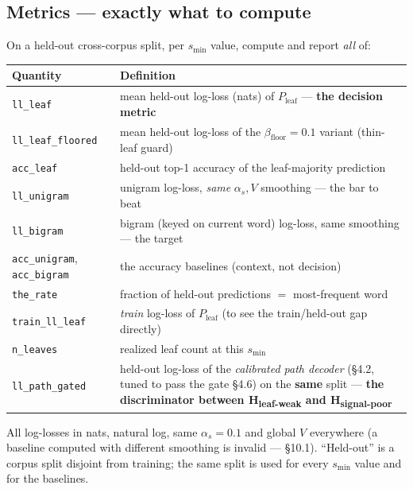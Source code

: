 \documentclass[11pt]{article}
\newcommand{\code}[1]{\texttt{#1}}
\begin{document}
\subsection{Metrics --- exactly what to compute}
On a held-out cross-corpus split, per $s_{\min}$ value, compute and report \emph{all} of:
\begin{center}
\begin{longtable}{@{}ll@{}}
\toprule
Quantity & Definition\\
\midrule
\endhead
\code{ll\_leaf} & mean held-out log-loss (nats) of $P_{\text{leaf}}$ --- \textbf{the decision metric}\\
\code{ll\_leaf\_floored} & mean held-out log-loss of the $\beta_{\text{floor}}{=}0.1$ variant (thin-leaf guard)\\
\code{acc\_leaf} & held-out top-1 accuracy of the leaf-majority prediction\\
\code{ll\_unigram} & unigram log-loss, \emph{same} $\alpha_s,V$ smoothing --- the bar to beat\\
\code{ll\_bigram} & bigram (keyed on current word) log-loss, same smoothing --- the target\\
\code{acc\_unigram}, \code{acc\_bigram} & the accuracy baselines (context, not decision)\\
\code{the\_rate} & fraction of held-out predictions $=$ most-frequent word\\
\code{train\_ll\_leaf} & \emph{train} log-loss of $P_{\text{leaf}}$ (to see the train/held-out gap directly)\\
\code{n\_leaves} & realized leaf count at this $s_{\min}$\\
\code{ll\_path\_gated} & held-out log-loss of the \emph{calibrated path decoder} (\S4.2, tuned to pass the gate \S4.6) on the \textbf{same} split --- \textbf{the discriminator between H\textsubscript{leaf-weak} and H\textsubscript{signal-poor}}\\
\bottomrule
\end{longtable}
\end{center}
All log-losses in nats, natural log, same $\alpha_s{=}0.1$ and global $V$ everywhere (a baseline computed with different smoothing is invalid --- \S10.1). ``Held-out'' is a corpus split disjoint from training; the same split is used for every $s_{\min}$ value and for the baselines.
\end{document}
